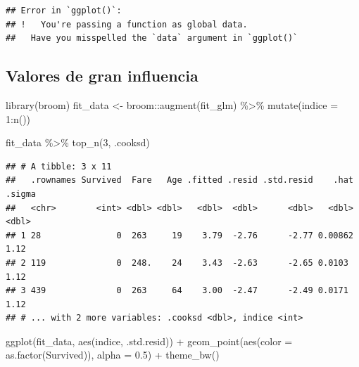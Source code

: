 \documentclass[
  12pt,
]{book}
\newenvironment{Shaded}{\begin{snugshade}}{\end{snugshade}}
\newcommand{\AttributeTok}[1]{\textcolor[rgb]{0.77,0.63,0.00}{#1}}
\newcommand{\DecValTok}[1]{\textcolor[rgb]{0.00,0.00,0.81}{#1}}
\newcommand{\FloatTok}[1]{\textcolor[rgb]{0.00,0.00,0.81}{#1}}
\newcommand{\FunctionTok}[1]{\textcolor[rgb]{0.00,0.00,0.00}{#1}}
\newcommand{\NormalTok}[1]{#1}
\newcommand{\OtherTok}[1]{\textcolor[rgb]{0.56,0.35,0.01}{#1}}
\newcommand{\SpecialCharTok}[1]{\textcolor[rgb]{0.00,0.00,0.00}{#1}}
\theoremstyle{definition}
\theoremstyle{definition}
\theoremstyle{definition}
\theoremstyle{definition}
\theoremstyle{remark}
\begin{document}
\begin{verbatim}
## Error in `ggplot()`:
## !   You're passing a function as global data.
##   Have you misspelled the `data` argument in `ggplot()`
\end{verbatim}

\hypertarget{valores-de-gran-influencia}{%
\subsection{Valores de gran influencia}\label{valores-de-gran-influencia}}

\begin{Shaded}
\begin{Highlighting}[]
\FunctionTok{library}\NormalTok{(broom)}
\NormalTok{fit\_data }\OtherTok{\textless{}{-}}\NormalTok{ broom}\SpecialCharTok{::}\FunctionTok{augment}\NormalTok{(fit\_glm) }\SpecialCharTok{\%\textgreater{}\%}
    \FunctionTok{mutate}\NormalTok{(}\AttributeTok{indice =} \DecValTok{1}\SpecialCharTok{:}\FunctionTok{n}\NormalTok{())}

\NormalTok{fit\_data }\SpecialCharTok{\%\textgreater{}\%}
    \FunctionTok{top\_n}\NormalTok{(}\DecValTok{3}\NormalTok{, .cooksd)}
\end{Highlighting}
\end{Shaded}

\begin{verbatim}
## # A tibble: 3 x 11
##   .rownames Survived  Fare   Age .fitted .resid .std.resid    .hat .sigma
##   <chr>        <int> <dbl> <dbl>   <dbl>  <dbl>      <dbl>   <dbl>  <dbl>
## 1 28               0  263     19    3.79  -2.76      -2.77 0.00862   1.12
## 2 119              0  248.    24    3.43  -2.63      -2.65 0.0103    1.12
## 3 439              0  263     64    3.00  -2.47      -2.49 0.0171    1.12
## # ... with 2 more variables: .cooksd <dbl>, indice <int>
\end{verbatim}

\begin{Shaded}
\begin{Highlighting}[]
\FunctionTok{ggplot}\NormalTok{(fit\_data, }\FunctionTok{aes}\NormalTok{(indice, .std.resid)) }\SpecialCharTok{+} \FunctionTok{geom\_point}\NormalTok{(}\FunctionTok{aes}\NormalTok{(}\AttributeTok{color =} \FunctionTok{as.factor}\NormalTok{(Survived)),}
    \AttributeTok{alpha =} \FloatTok{0.5}\NormalTok{) }\SpecialCharTok{+} \FunctionTok{theme\_bw}\NormalTok{()}
\end{Highlighting}
\end{Shaded}
\end{document}
